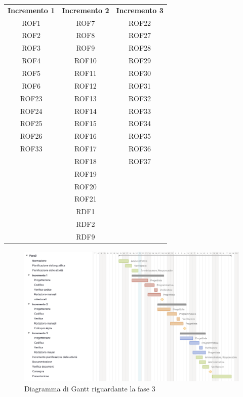 \begin{tabularx}{\textwidth}{| c | c | c | }
		\rowcolor{LightBlue}
		\color{white}\bfseries Incremento 1 & 
		\color{white}\bfseries Incremento 2 & 
		\color{white}\bfseries Incremento 3 \\[0.25cm]
		ROF1 & ROF7 & ROF22 \\ 
		ROF2 & ROF8 & ROF27 \\ 
		ROF3 & ROF9 & ROF28 \\ 
		ROF4 & ROF10 & ROF29 \\ 
		ROF5 & ROF11 & ROF30 \\ 
		ROF6 & ROF12 & ROF31 \\ 
		ROF23 & ROF13 & ROF32 \\ 
		ROF24 & ROF14 & ROF33 \\ 
		ROF25 & ROF15 & ROF34 \\ 
		ROF26 & ROF16 & ROF35 \\ 
		ROF33 & ROF17 & ROF36 \\ 
		& ROF18 & ROF37 \\ 
		& ROF19 & \\ 
		& ROF20 & \\ 
		& ROF21 & \\ 
		& RDF1 & \\ 
		& RDF2 & \\ 
		& RDF9 & \\ \hline
	\end{tabularx}

\begin{figure}[h]
	\centering
	\includegraphics[scale=0.50]{images/fase3.png}
	\caption{Diagramma di Gantt riguardante la fase 3}
\end{figure}